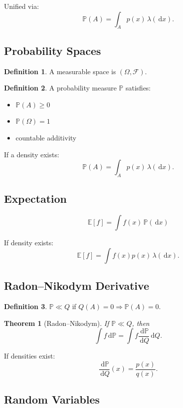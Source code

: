 \documentclass[12pt,oneside]{book}
\numberwithin{equation}{section}
\theoremstyle{definition}
\newtheorem{definition}{Definition}[section]
\theoremstyle{plain}
\newtheorem{theorem}{Theorem}[section]
\theoremstyle{remark}
\newcommand{\E}{\mathbb{E}}
\newcommand{\Prob}{\mathbb{P}}
\newcommand{\dd}{\,\mathrm{d}}
\begin{document}
Unified via:
\[
\Prob(A) = \int_A p(x)\,\lambda(\dd x).
\]


\subsection{Probability Spaces}

\begin{definition}
A measurable space is $(\Omega,\mathcal{F})$.
\end{definition}

\begin{definition}
A probability measure $\Prob$ satisfies:
\begin{itemize}
\item $\Prob(A) \ge 0$
\item $\Prob(\Omega) = 1$
\item countable additivity
\end{itemize}
\end{definition}

If a density exists:
\[
\Prob(A) = \int_A p(x)\,\lambda(\dd x).
\]


\subsection{Expectation}

\[
\E[f] = \int f(x)\,\Prob(\dd x)
\]

If density exists:
\[
\E[f] = \int f(x)p(x)\,\lambda(\dd x).
\]


\subsection{Radon--Nikodym Derivative}

\begin{definition}
$\Prob \ll Q$ if $Q(A)=0 \Rightarrow \Prob(A)=0$.
\end{definition}

\begin{theorem}[Radon--Nikodym]
If $\Prob \ll Q$, then
\[
\int f \dd \Prob = \int f \frac{\dd \Prob}{\dd Q} \dd Q.
\]
\end{theorem}

If densities exist:
\[
\frac{\dd \Prob}{\dd Q}(x) = \frac{p(x)}{q(x)}.
\]


\subsection{Random Variables}
\end{document}
